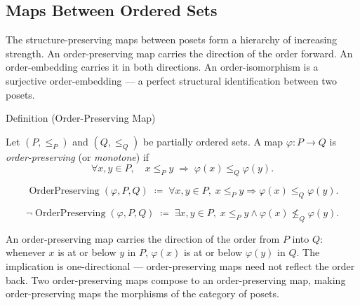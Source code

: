 
\subsection{Maps Between Ordered Sets}
\label{sec:maps-ordered-sets}

\begin{remark*}
The structure-preserving maps between posets form a hierarchy of increasing
strength.  An order-preserving map carries the direction of the order
forward.  An order-embedding carries it in both directions.  An
order-isomorphism is a surjective order-embedding --- a perfect structural
identification between two posets.
\end{remark*}


\begin{definitionbox}{Definition (Order-Preserving Map)}
\begin{definition}
\label{def:order-preserving-map}
Let $(P, \leq_P)$ and $(Q, \leq_Q)$ be partially ordered sets.  A map
$\varphi : P \to Q$ is \emph{order-preserving} (or \emph{monotone}) if
\[
\forall x, y \in P, \quad
x \leq_P y \;\Longrightarrow\; \varphi(x) \leq_Q \varphi(y).
\]
\end{definition}
\end{definitionbox}

\begin{remark*}
\[
\operatorname{OrderPreserving}(\varphi, P, Q)
\;\coloneqq\;
\forall x, y \in P,\;
x \leq_P y \Rightarrow \varphi(x) \leq_Q \varphi(y).
\]
\end{remark*}

\begin{remark*}
\[
\neg\operatorname{OrderPreserving}(\varphi, P, Q)
\;\coloneqq\;
\exists x, y \in P,\;
x \leq_P y \land \varphi(x) \not\leq_Q \varphi(y).
\]
\end{remark*}

\begin{remark*}[Interpretation]
An order-preserving map carries the direction of the order from $P$ into
$Q$: whenever $x$ is at or below $y$ in $P$, $\varphi(x)$ is at or below
$\varphi(y)$ in $Q$.  The implication is one-directional --- order-preserving
maps need not reflect the order back.  Two order-preserving maps compose
to an order-preserving map, making order-preserving maps the morphisms
of the category of posets.
\end{remark*}

